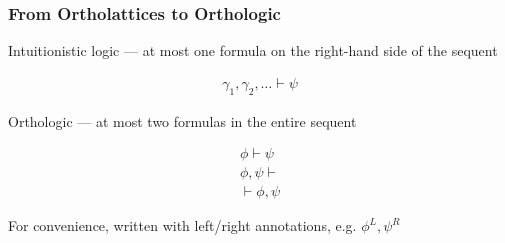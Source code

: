 \documentclass[
    aspectratio=169,
    xcolor={dvipsnames},
]{beamer}
\begin{document}
\begin{frame}
    \frametitle{From Ortholattices to Orthologic}


    Intuitionistic logic --- at most one formula on the right-hand side of the sequent

    \begin{gather*}
        \gamma_1, \gamma_2, \ldots \vdash \psi
    \end{gather*}

    \pause


    Orthologic --- at most two formulas in the entire sequent

    \begin{gather*}
        \phi \vdash \psi \\
        \phi, \psi \vdash \\
        \vdash \phi, \psi
    \end{gather*}

    \pause


    For convenience, written with left/right annotations, e.g. \(\phi^L, \psi^R\)

\end{frame}
\end{document}
